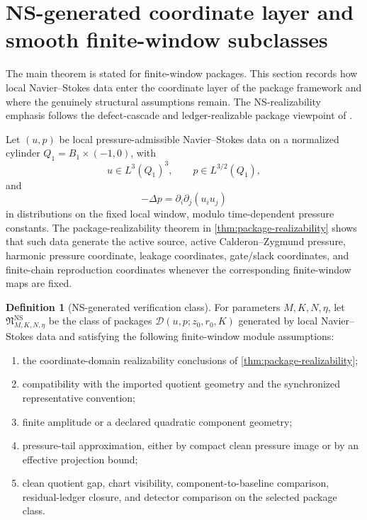 \documentclass[11pt]{article}
\numberwithin{equation}{section}
\theoremstyle{definition}
\newtheorem{definition}[definition]{Definition}
\theoremstyle{remark}
\newcommand{\NS}{\mathrm{NS}}
\newcommand{\calD}{\mathcal D}
\begin{document}
\section{NS-generated coordinate layer and smooth finite-window subclasses}\label{sec:ns-generated-final}

The main theorem is stated for finite-window packages.  This section records how local Navier--Stokes data enter the coordinate layer of the package framework and where the genuinely structural assumptions remain.  The NS-realizability emphasis follows the defect-cascade and ledger-realizable package viewpoint of \cite{YuInvisible2026,YuCriticalLedgers2026,YuSingularityAuditTransfer2026}.

Let \((u,p)\) be local pressure-admissible Navier--Stokes data on a normalized cylinder \(Q_1=B_1\times(-1,0)\), with
\[
        u\in L^3(Q_1)^3,
        \qquad
        p\in L^{3/2}(Q_1),
\]
and
\[
        -\Delta p=\partial_i\partial_j(u_iu_j)
\]
in distributions on the fixed local window, modulo time-dependent pressure constants.  The package-realizability theorem in \cref{thm:package-realizability} shows that such data generate the active source, active Calderon--Zygmund pressure, harmonic pressure coordinate, leakage coordinates, gate/slack coordinates, and finite-chain reproduction coordinates whenever the corresponding finite-window maps are fixed.

\begin{definition}[NS-generated verification class]\label{def:ns-generated-verification-final}
For parameters \(M,K,N,\eta\), let \(\mathfrak N_{M,K,N,\eta}^{\NS}\) be the class of packages \(\calD(u,p;z_0,r_0,K)\) generated by local Navier--Stokes data and satisfying the following finite-window module assumptions:
\begin{enumerate}[label=(\roman*)]
\item the coordinate-domain realizability conclusions of \cref{thm:package-realizability};
\item compatibility with the imported quotient geometry and the synchronized representative convention;
\item finite amplitude or a declared quadratic component geometry;
\item pressure-tail approximation, either by compact clean pressure image or by an effective projection bound;
\item clean quotient gap, chart visibility, component-to-baseline comparison, residual-ledger closure, and detector comparison on the selected package class.
\end{enumerate}
\end{definition}
\end{document}
